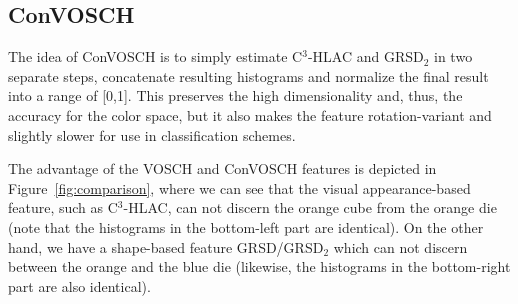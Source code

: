 \documentclass[a4paper, 10 pt, conference]{sty/ieeeconf}
\begin{document}
\subsection{ConVOSCH}
The idea of ConVOSCH is to simply estimate C$^3$-HLAC and GRSD$_2$ in two separate steps, 
concatenate resulting histograms and normalize the final result into a range of [0,1]. This preserves the 
high dimensionality and, thus, the accuracy for the color space, but it also 
makes the feature rotation-variant and slightly slower for use 
in classification schemes.
\vspace{2ex}

The advantage of the VOSCH and ConVOSCH features is depicted in Figure~\ref{fig:comparison},
where we can see that the visual appearance-based feature, such as C$^3$-HLAC, can not
discern the orange cube from the orange die (note that the histograms in the bottom-left part are identical). 
On the other hand, we have a shape-based feature GRSD/GRSD$_2$
which can not discern between the orange and the blue die (likewise, the
histograms in the bottom-right part are also identical).
\end{document}
